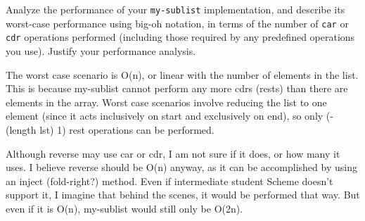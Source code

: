 \documentclass[11pt]{article}
\begin{document}
\begin{ps}
\begin{problemcit}{}Analyze the performance of your \verb|my-sublist| implementation, and describe its worst-case performance using big-oh notation, in terms of the number of \verb|car| or \verb|cdr| operations performed (including those required by any predefined operations you use). Justify your performance analysis.\end{problemcit}

\begin{soln}
The worst case scenario is O(n), or linear with the number of elements in the list. This is because my-sublist cannot perform any more cdrs (rests) than there are elements in the array. Worst case scenarios involve reducing the list to one element (since it acts inclusively on start and exclusively on end), so only (- (length lst) 1) rest operations can be performed.

Although reverse may use car or cdr, I am not sure if it does, or how many it uses. I believe reverse should be O(n) anyway, as it can be accomplished by using an inject (fold-right?) method. Even if intermediate student Scheme doesn't support it, I imagine that behind the scenes, it would be performed that way. But even if it is O(n), my-sublist would still only be O(2n).
\end{soln}
\end{ps}
\end{document}
